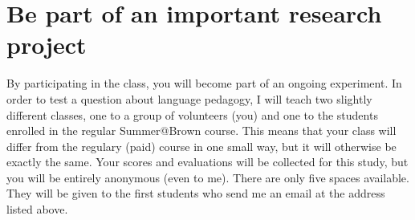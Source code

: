 \documentclass[11pt]{article}
\begin{document}
	\section*{Be part of an important research project}
		
		By participating in the class, you will become part of an ongoing experiment.
		In order to test a question about language pedagogy, I will teach two slightly different classes, one to a group of volunteers (you) and one to the students enrolled in the regular Summer@Brown course. 
		This means that your class will differ from the regulary (paid) course in one small way, but it will otherwise be exactly the same.
		Your scores and evaluations will be collected for this study, but you will be entirely anonymous (even to me).
		There are only five spaces available. They will be given to the first students who send me an email at the address listed above.
		
\end{document}
